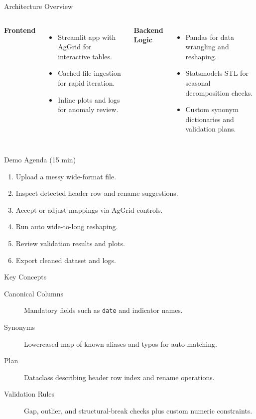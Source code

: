 \documentclass[aspectratio=169]{beamer}
\begin{document}
\begin{frame}{Architecture Overview}
  \begin{columns}[T]
      \textbf{Frontend}
      \begin{itemize}
        \item Streamlit app with AgGrid for interactive tables.
        \item Cached file ingestion for rapid iteration.
        \item Inline plots and logs for anomaly review.
      \end{itemize}
      \textbf{Backend Logic}
      \begin{itemize}
        \item Pandas for data wrangling and reshaping.
        \item Statsmodels STL for seasonal decomposition checks.
        \item Custom synonym dictionaries and validation plans.
      \end{itemize}
  \end{columns}
\end{frame}

\begin{frame}{Demo Agenda (15 min)}
  \begin{enumerate}
    \item Upload a messy wide-format file.
    \item Inspect detected header row and rename suggestions.
    \item Accept or adjust mappings via AgGrid controls.
    \item Run auto wide-to-long reshaping.
    \item Review validation results and plots.
    \item Export cleaned dataset and logs.
  \end{enumerate}
\end{frame}

\begin{frame}{Key Concepts}
  \begin{description}
    \item[Canonical Columns] Mandatory fields such as \texttt{date} and indicator names.
    \item[Synonyms] Lowercased map of known aliases and typos for auto-matching.
    \item[Plan] Dataclass describing header row index and rename operations.
    \item[Validation Rules] Gap, outlier, and structural-break checks plus custom numeric constraints.
  \end{description}
\end{frame}
\end{document}
